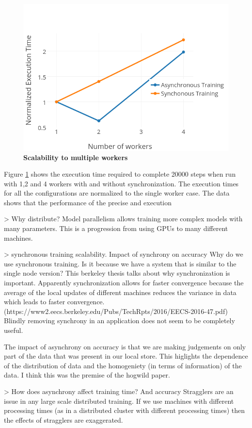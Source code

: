 \begin{figure}[h]
\centering
  \includegraphics[keepaspectratio,width=.9\columnwidth]{figures/15712-corrected-scalability.png}
  \caption{\textbf{Scalability to multiple workers}}
  \label{fig:scalability}
\end{figure}

Figure \ref{fig:scalability} shows the execution time required 
to complete 20000 steps when run with 1,2 and 4 workers with
and without synchronization. The 
execution times for all the configurations are normalized to 
the single worker case. The data shows that the performance
of the precise and execution 





> Why distribute? 
Model parallelism allows training more complex models with many 
parameters. This is a progression from using GPUs to many different
machines. 

> synchronous training scalability. Impact of synchrony on accuracy
Why do we use synchronous training. Is it because we have a system
that is similar to the single node version? 
This berkeley thesis talks about why synchronization is important. 
Apparently synchronization allows for faster convergence because 
the average of the local updates of different machines reduces the
variance in data which leads to faster convergence. (https://www2.eecs.berkeley.edu/Pubs/TechRpts/2016/EECS-2016-47.pdf)
Blindly removing synchrony in an application does not seem to be
completely useful.

The impact of asynchrony on accuracy is that we are making judgements
on only part of the data that was present in our local store. This
higlights the dependence of the distribution of data and the homogeniety
(in terms of information) of the data. I think this was the premise of 
the hogwild paper.

> How does asynchrony affect training time? And accuracy
Stragglers are an issue in any large scale distributed training. If 
we use machines with different processing times (as in a distributed
cluster with different processing times) then the effects of stragglers
are exaggerated. 




